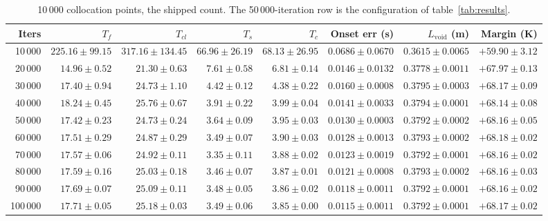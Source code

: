\documentclass[11pt,a4paper]{article}
\begin{document}
\begin{table}[!ht]
\caption{10\,000 collocation points, the shipped count. The 50\,000-iteration row is the
configuration of table~\ref{tab:results}.}
\label{tab:lad10000}
\centering\footnotesize\setlength{\tabcolsep}{4pt}
\begin{tabular}{@{}rrrrrrrr@{}}
\toprule
Iters & $T_f$ & $T_{cl}$ & $T_s$ & $T_c$ & Onset err (s) & $L_{\mathrm{void}}$ (m) & Margin (K) \\
\midrule
10\,000 & $225.16 \pm 99.15$ & $317.16 \pm 134.45$ & $66.96 \pm 26.19$ & $68.13 \pm 26.95$ & $0.0686 \pm 0.0670$ & $0.3615 \pm 0.0065$ & $+59.90 \pm 3.12$ \\
20\,000 & $14.96 \pm 0.52$ & $21.30 \pm 0.63$ & $7.61 \pm 0.58$ & $6.81 \pm 0.14$ & $0.0146 \pm 0.0132$ & $0.3778 \pm 0.0011$ & $+67.97 \pm 0.13$ \\
30\,000 & $17.40 \pm 0.94$ & $24.73 \pm 1.10$ & $4.42 \pm 0.12$ & $4.38 \pm 0.22$ & $0.0160 \pm 0.0008$ & $0.3795 \pm 0.0003$ & $+68.17 \pm 0.09$ \\
40\,000 & $18.24 \pm 0.45$ & $25.76 \pm 0.67$ & $3.91 \pm 0.22$ & $3.99 \pm 0.04$ & $0.0141 \pm 0.0033$ & $0.3794 \pm 0.0001$ & $+68.14 \pm 0.08$ \\
50\,000 & $17.42 \pm 0.23$ & $24.73 \pm 0.24$ & $3.64 \pm 0.09$ & $3.95 \pm 0.03$ & $0.0130 \pm 0.0003$ & $0.3792 \pm 0.0002$ & $+68.16 \pm 0.05$ \\
60\,000 & $17.51 \pm 0.29$ & $24.87 \pm 0.29$ & $3.49 \pm 0.07$ & $3.90 \pm 0.03$ & $0.0128 \pm 0.0013$ & $0.3793 \pm 0.0002$ & $+68.18 \pm 0.02$ \\
70\,000 & $17.57 \pm 0.06$ & $24.92 \pm 0.11$ & $3.35 \pm 0.11$ & $3.88 \pm 0.02$ & $0.0123 \pm 0.0019$ & $0.3792 \pm 0.0001$ & $+68.16 \pm 0.02$ \\
80\,000 & $17.59 \pm 0.16$ & $25.03 \pm 0.18$ & $3.46 \pm 0.07$ & $3.87 \pm 0.01$ & $0.0121 \pm 0.0008$ & $0.3793 \pm 0.0002$ & $+68.16 \pm 0.03$ \\
90\,000 & $17.69 \pm 0.07$ & $25.09 \pm 0.11$ & $3.48 \pm 0.05$ & $3.86 \pm 0.02$ & $0.0118 \pm 0.0011$ & $0.3792 \pm 0.0001$ & $+68.16 \pm 0.02$ \\
100\,000 & $17.71 \pm 0.05$ & $25.18 \pm 0.03$ & $3.49 \pm 0.06$ & $3.85 \pm 0.00$ & $0.0115 \pm 0.0011$ & $0.3792 \pm 0.0001$ & $+68.17 \pm 0.02$ \\
\bottomrule
\end{tabular}
\end{table}
\end{document}
